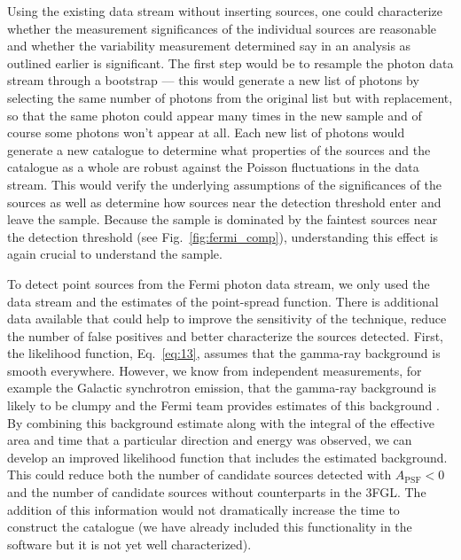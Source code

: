\documentclass[useAMS,usenatbib]{mn2e}
\begin{document}
Using the existing data stream without inserting sources, one could
characterize whether the measurement significances of the individual
sources are reasonable and whether the variability measurement
determined say in an analysis as outlined earlier is significant.  The
first step would be to resample the photon data stream through a
bootstrap --- this would generate a new list of photons by selecting
the same number of photons from the original list but with
replacement, so that the same photon could appear many times in the
new sample and of course some photons won't appear at all.  Each new
list of photons would generate a new catalogue to determine what
properties of the sources and the catalogue as a whole are robust
against the Poisson fluctuations in the data stream.  This would
verify the underlying assumptions of the significances of the sources
as well as determine how sources near the detection threshold enter
and leave the sample.  Because the sample is dominated by the faintest
sources near the detection threshold (see Fig.~\ref{fig:fermi_comp}),
understanding this effect is again crucial to understand the sample.

To detect point sources from the Fermi photon data stream, we only
used the data stream and the estimates of the point-spread
function. There is additional data available that could help to
improve the sensitivity of the technique, reduce the number of false
positives and better characterize the sources detected.  First, the
likelihood function, Eq.~\ref{eq:13}, assumes that the gamma-ray
background is smooth everywhere.  However, we know from independent
measurements, for example the Galactic synchrotron emission, that the
gamma-ray background is likely to be clumpy and the Fermi team
provides estimates of this background \citep[e.g.][]{Fermi1602.07246}.
By combining this background
estimate along with the integral of the effective area and time that a
particular direction and energy was observed, we can develop an
improved likelihood function that includes the estimated background.
This could reduce both the number of candidate sources detected with
$A_\mathrm{PSF}<0$ and the number of candidate sources without
counterparts in the 3FGL.  The addition of this information would not
dramatically increase the time to construct the catalogue (we have
already included this functionality in the software but it is not yet
well characterized).
\end{document}
